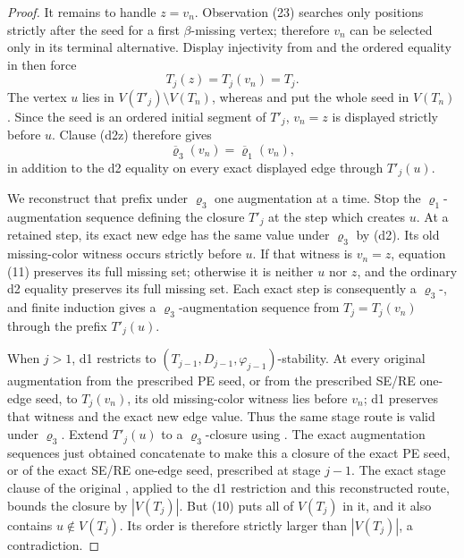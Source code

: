 \begin{proof}
It remains to handle \(z=v_n\).  Observation (23) searches only positions
strictly after the seed for a first \(\beta\)-missing vertex; therefore
\(v_n\) can be selected only in its terminal alternative.  Display
injectivity from  and the ordered equality in
 then force
\[
                 T_j(z)=T_j(v_n)=T_j.                         \tag{10}
\]
The vertex \(u\) lies in \(V(T'_j)\setminus V(T_n)\), whereas
 and
 put the whole seed in \(V(T_n)\).  Since
the seed is an ordered initial segment of \(T'_j\), \(v_n=z\) is displayed
strictly before \(u\).  Clause (d2z)
therefore gives
\[
              \overline\varrho_3(v_n)=\overline\varrho_1(v_n), \tag{11}
\]
in addition to the d2 equality on every exact displayed edge through
\(T'_j(u)\).

We reconstruct that prefix under \(\varrho_3\) one augmentation at a
time.  Stop the \(\varrho_1\)-augmentation sequence defining the closure
\(T'_j\) at the step which creates \(u\).  At a retained step, its exact
new edge has the same value under \(\varrho_3\) by (d2).  Its old
missing-color witness occurs strictly before \(u\).  If that witness is
\(v_n=z\), equation (11) preserves its full missing set; otherwise it is
neither \(u\) nor \(z\), and the ordinary d2 equality preserves its full
missing set.  Each exact step is consequently a
\(\varrho_3\)-, and finite induction gives
a \(\varrho_3\)-augmentation sequence from \(T_j=T_j(v_n)\) through the
prefix \(T'_j(u)\).

When \(j>1\), d1 restricts to
\((T_{j-1},D_{j-1},\varphi_{j-1})\)-stability.  At every original
augmentation from the prescribed PE seed, or from the prescribed SE/RE
one-edge seed, to \(T_j(v_n)\), its old missing-color witness lies before
\(v_n\); d1 preserves that witness and the exact new edge value.  Thus the
same stage route is valid under \(\varrho_3\).  Extend \(T'_j(u)\) to a
\(\varrho_3\)-closure using .  The exact
augmentation sequences just obtained concatenate to make this a closure
of the exact PE seed, or of the exact SE/RE one-edge seed, prescribed at
stage \(j-1\).  The exact stage clause of the original
, applied to the d1 restriction and this
reconstructed route, bounds the closure by
\(|V(T_j)|\).  But (10) puts all of \(V(T_j)\) in it, and it also contains
\(u\notin V(T_j)\).  Its order is therefore strictly larger than
\(|V(T_j)|\), a contradiction.


\end{proof}
